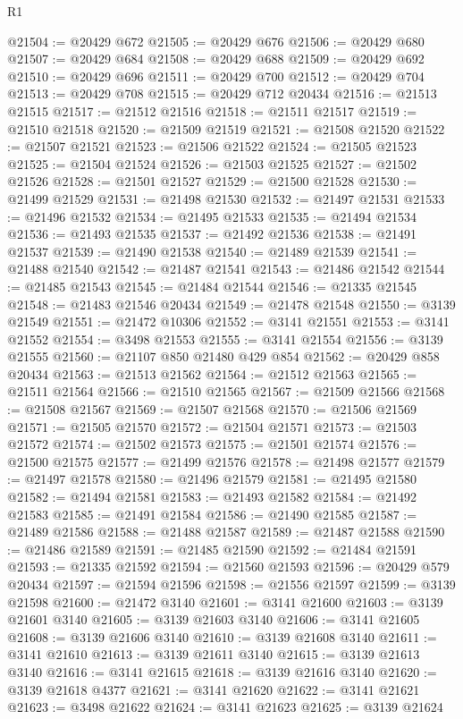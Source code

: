 \begin{lexlean}{R1}
\begin{coremodule}
@21504 := @20429 @672
@21505 := @20429 @676
@21506 := @20429 @680
@21507 := @20429 @684
@21508 := @20429 @688
@21509 := @20429 @692
@21510 := @20429 @696
@21511 := @20429 @700
@21512 := @20429 @704
@21513 := @20429 @708
@21515 := @20429 @712 @20434
@21516 := @21513 @21515
@21517 := @21512 @21516
@21518 := @21511 @21517
@21519 := @21510 @21518
@21520 := @21509 @21519
@21521 := @21508 @21520
@21522 := @21507 @21521
@21523 := @21506 @21522
@21524 := @21505 @21523
@21525 := @21504 @21524
@21526 := @21503 @21525
@21527 := @21502 @21526
@21528 := @21501 @21527
@21529 := @21500 @21528
@21530 := @21499 @21529
@21531 := @21498 @21530
@21532 := @21497 @21531
@21533 := @21496 @21532
@21534 := @21495 @21533
@21535 := @21494 @21534
@21536 := @21493 @21535
@21537 := @21492 @21536
@21538 := @21491 @21537
@21539 := @21490 @21538
@21540 := @21489 @21539
@21541 := @21488 @21540
@21542 := @21487 @21541
@21543 := @21486 @21542
@21544 := @21485 @21543
@21545 := @21484 @21544
@21546 := @21335 @21545
@21548 := @21483 @21546 @20434
@21549 := @21478 @21548
@21550 := @3139 @21549
@21551 := @21472 @10306
@21552 := @3141 @21551
@21553 := @3141 @21552
@21554 := @3498 @21553
@21555 := @3141 @21554
@21556 := @3139 @21555
@21560 := @21107 @850 @21480 @429 @854
@21562 := @20429 @858 @20434
@21563 := @21513 @21562
@21564 := @21512 @21563
@21565 := @21511 @21564
@21566 := @21510 @21565
@21567 := @21509 @21566
@21568 := @21508 @21567
@21569 := @21507 @21568
@21570 := @21506 @21569
@21571 := @21505 @21570
@21572 := @21504 @21571
@21573 := @21503 @21572
@21574 := @21502 @21573
@21575 := @21501 @21574
@21576 := @21500 @21575
@21577 := @21499 @21576
@21578 := @21498 @21577
@21579 := @21497 @21578
@21580 := @21496 @21579
@21581 := @21495 @21580
@21582 := @21494 @21581
@21583 := @21493 @21582
@21584 := @21492 @21583
@21585 := @21491 @21584
@21586 := @21490 @21585
@21587 := @21489 @21586
@21588 := @21488 @21587
@21589 := @21487 @21588
@21590 := @21486 @21589
@21591 := @21485 @21590
@21592 := @21484 @21591
@21593 := @21335 @21592
@21594 := @21560 @21593
@21596 := @20429 @579 @20434
@21597 := @21594 @21596
@21598 := @21556 @21597
@21599 := @3139 @21598
@21600 := @21472 @3140
@21601 := @3141 @21600
@21603 := @3139 @21601 @3140
@21605 := @3139 @21603 @3140
@21606 := @3141 @21605
@21608 := @3139 @21606 @3140
@21610 := @3139 @21608 @3140
@21611 := @3141 @21610
@21613 := @3139 @21611 @3140
@21615 := @3139 @21613 @3140
@21616 := @3141 @21615
@21618 := @3139 @21616 @3140
@21620 := @3139 @21618 @4377
@21621 := @3141 @21620
@21622 := @3141 @21621
@21623 := @3498 @21622
@21624 := @3141 @21623
@21625 := @3139 @21624

\end{coremodule}
\end{lexlean}
